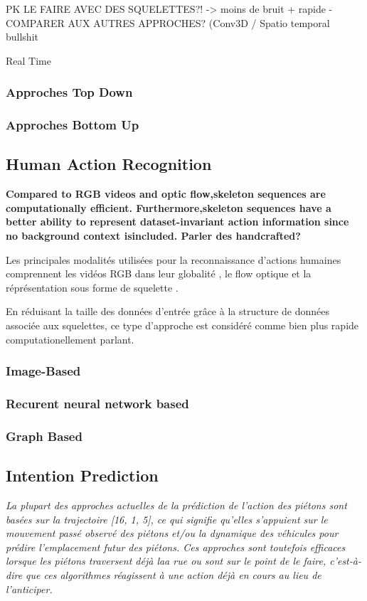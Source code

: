 PK LE FAIRE AVEC DES SQUELETTES?! -> moins de bruit + rapide
-COMPARER AUX AUTRES APPROCHES? (Conv3D / Spatio temporal bullshit

Real Time

\label{subsec:SQUEL}
\subsubsection{Approches Top Down}
\subsubsection{Approches Bottom Up}

\subsection{Human Action Recognition}

\textbf{ Compared to RGB videos and optic flow,skeleton sequences are computationally efficient. Furthermore,skeleton  sequences  have  a  better  ability  to  represent  dataset-invariant  action  information  since  no  background  context  isincluded.
Parler des handcrafted?}

Les principales modalités utilisées pour la reconnaissance d'actions humaines comprennent les vidéos RGB dans leur globalité \cite{donahue2015long,2014arXiv1412.0767T,varol2017long,Wu_2018_CVPR}, le flow optique \cite{simonyan2014two,zhang2016real,sevilla2018integration,DanutPOP} et la réprésentation sous forme de squelette \cite{vemulapalli2014human,du2015hierarchical,2016arXiv160707043L,2018arXiv180107455Y}.

En réduisant la taille des données d'entrée grâce à la structure de données associée aux squelettes, ce type d'approche est considéré comme bien plus rapide computationellement parlant.

\label{subsec:HAR}

\subsubsection{Image-Based}
\subsubsection{Recurent neural network based}
\subsubsection{Graph Based}

\subsection{Intention Prediction}
\textit{La plupart des approches actuelles de la prédiction de l'action des piétons sont basées sur la trajectoire [16, 1, 5], ce qui signifie qu'elles s'appuient sur le mouvement passé observé des piétons et/ou la dynamique des véhicules pour prédire l'emplacement futur des piétons. Ces approches sont toutefois efficaces lorsque les piétons traversent déjà laa rue ou sont sur le point de le faire, c'est-à-dire que ces algorithmes réagissent à une action déjà en cours au lieu de l'anticiper.}

